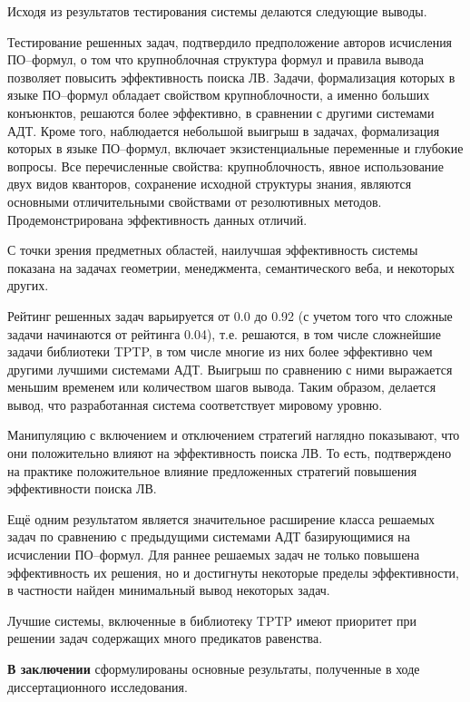 \documentclass[a4paper]{report}
\begin{document}
Исходя из результатов тестирования системы делаются следующие выводы.

Тестирование решенных задач, подтвердило предположение авторов исчисления ПО--формул, о том что крупноблочная структура формул и правила вывода позволяет повысить эффективность поиска ЛВ. Задачи, формализация которых в языке ПО--формул обладает свойством крупноблочности, а именно больших конъюнктов, решаются более эффективно, в сравнении с другими системами АДТ. Кроме того, наблюдается небольшой выигрыш в задачах, формализация которых в языке ПО--формул, включает экзистенциальные переменные и глубокие вопросы. Все перечисленные свойства: крупноблочность, явное использование двух видов кванторов, сохранение исходной структуры знания, являются основными отличительными свойствами от резолютивных методов. Продемонстрирована эффективность данных отличий.

С точки зрения предметных областей, наилучшая эффективность системы показана на задачах геометрии, менеджмента, семантического веба, и некоторых других.

Рейтинг решенных задач варьируется от 0.0 до 0.92 (с учетом того что сложные задачи начинаются от рейтинга 0.04), т.е. решаются, в том числе сложнейшие задачи библиотеки TPTP, в том числе многие из них более эффективно чем другими лучшими системами АДТ. Выигрыш по сравнению с ними выражается меньшим временем или количеством шагов вывода. Таким образом, делается вывод, что разработанная система соответствует мировому уровню.

Манипуляцию с включением и отключением стратегий наглядно показывают, что они положительно влияют на эффективность поиска ЛВ. То есть, подтверждено на практике положительное влияние предложенных стратегий повышения эффективности поиска ЛВ.

Ещё одним результатом является значительное расширение класса решаемых задач по сравнению с предыдущими системами АДТ базирующимися на исчислении ПО--формул. Для раннее решаемых задач не только повышена эффективность их решения, но и достигнуты некоторые пределы эффективности, в частности найден минимальный вывод некоторых задач.

Лучшие системы, включенные в библиотеку TPTP имеют приоритет при решении задач содержащих много предикатов равенства.


\textbf{В заключении} сформулированы основные результаты, полученные в ходе диссертационного исследования.

\end{document}
